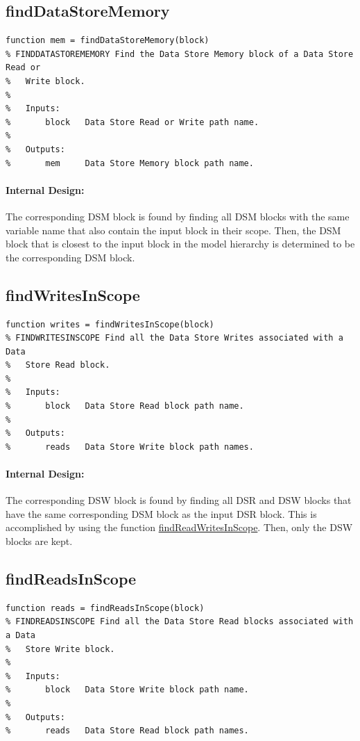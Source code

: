 \documentclass[12pt,letterpaper]{report}
\begin{document}
\subsection{findDataStoreMemory}
\begin{lstlisting}
function mem = findDataStoreMemory(block)
% FINDDATASTOREMEMORY Find the Data Store Memory block of a Data Store Read or
%   Write block.
%
%   Inputs:
%       block   Data Store Read or Write path name.
%
%   Outputs:
%       mem     Data Store Memory block path name.
\end{lstlisting}
\paragraph{Internal Design:} The corresponding DSM block is found by finding all DSM blocks with the same variable name that also contain the input block in their scope. Then, the DSM block that is closest to the input block in the model hierarchy is determined to be the corresponding DSM block.

\subsection{findWritesInScope} \label{findWritesInScope}
\begin{lstlisting}
function writes = findWritesInScope(block)
% FINDWRITESINSCOPE Find all the Data Store Writes associated with a Data
%   Store Read block.
%
%   Inputs:
%       block   Data Store Read block path name.
%
%   Outputs:
%       reads   Data Store Write block path names.
\end{lstlisting}
\paragraph{Internal Design:} The corresponding DSW block is found by finding all DSR and DSW blocks that have the same corresponding DSM block as the input DSR block. This is accomplished by using the function \hyperref[findReadWritesInScope]{findReadWritesInScope}. Then, only the DSW blocks are kept.

\subsection{findReadsInScope} \label{findReadsInScope}
\begin{lstlisting}
function reads = findReadsInScope(block)
% FINDREADSINSCOPE Find all the Data Store Read blocks associated with a Data
%   Store Write block.
%
%   Inputs:
%       block   Data Store Write block path name.
%
%   Outputs:
%       reads   Data Store Read block path names.
\end{lstlisting}
\end{document}
